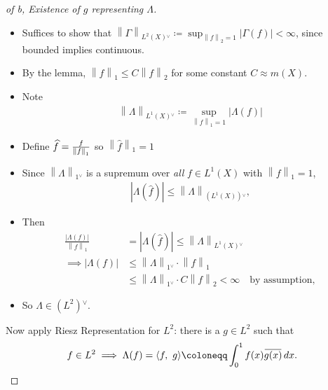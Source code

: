 \begin{solution}
\begin{proof}[of b, Existence of $g$ representing $\Lambda$]
\begin{itemize}
\item
  Suffices to show that
  \({\left\lVert {\Gamma} \right\rVert}_{L^2(X) {}^{ \vee }} \coloneqq\sup_{{\left\lVert {f} \right\rVert}_2 = 1} {\left\lvert {\Gamma(f)} \right\rvert} < \infty\),
  since bounded implies continuous.
\item
  By the lemma,
  \({\left\lVert {f} \right\rVert}_1 \leq C{\left\lVert {f} \right\rVert}_2\)
  for some constant \(C \approx m(X)\).
\item
  Note
  \begin{align*}{\left\lVert {\Lambda} \right\rVert}_{L^1(X) {}^{ \vee }} \coloneqq\displaystyle\sup_{{\left\lVert {f} \right\rVert}_1 = 1} {\left\lvert {\Lambda(f)} \right\rvert}\end{align*}
\item
  Define \(\widehat{f} = {f\over {\left\lVert {f} \right\rVert}_1}\) so
  \({\left\lVert {\widehat{f}} \right\rVert}_1 = 1\)
\item
  Since \({\left\lVert {\Lambda} \right\rVert}_{1 {}^{ \vee }}\) is a
  supremum over \emph{all} \(f \in L^1(X)\) with
  \({\left\lVert {f} \right\rVert}_1 =1\),
  \begin{align*}
  {\left\lvert {\Lambda(\widehat{f})} \right\rvert} \leq {\left\lVert {\Lambda} \right\rVert}_{(L^1(X)) {}^{ \vee }}
  ,\end{align*}
\item
  Then
  \begin{align*}
  \frac{{\left\lvert {\Lambda(f)} \right\rvert}}{{\left\lVert {f} \right\rVert}_1} &= {\left\lvert {\Lambda(\widehat{f})} \right\rvert} \leq {\left\lVert {\Lambda} \right\rVert}_{L^1(X) {}^{ \vee }} \\
  \implies {\left\lvert {\Lambda(f)} \right\rvert} 
  &\leq {\left\lVert {\Lambda} \right\rVert}_{1 {}^{ \vee }} \cdot {\left\lVert {f} \right\rVert}_1 \\
  &\leq {\left\lVert {\Lambda} \right\rVert}_{1 {}^{ \vee }} \cdot C {\left\lVert {f} \right\rVert}_2 < \infty \quad\text{by assumption}
  ,\end{align*}
\item
  So \(\Lambda \in (L^2) {}^{ \vee }\).
\end{itemize}

Now apply Riesz Representation for \(L^2\): there is a \(g \in L^2\)
such that
\begin{align*}f\in L^2 \implies \Lambda(f) = {\left\langle {f},~{g} \right\rangle} \coloneqq\int_0^1 f(x) \mkern 1.5mu\overline{\mkern-1.5mug(x)\mkern-1.5mu}\mkern 1.5mu\, dx.\end{align*}


\end{proof}
\end{solution}
